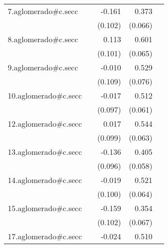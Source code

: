 {\begin{longtable}{l*{4}{D{.}{.}{-1}}}
\addlinespace
7.aglomerado#c.secc&                     &      -0.161         &       0.373\sym{***}&                     \\
            &                     &     (0.102)         &     (0.066)         &                     \\
\addlinespace
8.aglomerado#c.secc&                     &       0.113         &       0.601\sym{***}&                     \\
            &                     &     (0.101)         &     (0.065)         &                     \\
\addlinespace
9.aglomerado#c.secc&                     &      -0.010         &       0.529\sym{***}&                     \\
            &                     &     (0.109)         &     (0.076)         &                     \\
\addlinespace
10.aglomerado#c.secc&                     &      -0.017         &       0.512\sym{***}&                     \\
            &                     &     (0.097)         &     (0.061)         &                     \\
\addlinespace
12.aglomerado#c.secc&                     &       0.017         &       0.544\sym{***}&                     \\
            &                     &     (0.099)         &     (0.063)         &                     \\
\addlinespace
13.aglomerado#c.secc&                     &      -0.136         &       0.405\sym{***}&                     \\
            &                     &     (0.096)         &     (0.058)         &                     \\
\addlinespace
14.aglomerado#c.secc&                     &      -0.019         &       0.521\sym{***}&                     \\
            &                     &     (0.100)         &     (0.064)         &                     \\
\addlinespace
15.aglomerado#c.secc&                     &      -0.159         &       0.354\sym{***}&                     \\
            &                     &     (0.102)         &     (0.067)         &                     \\
\addlinespace
17.aglomerado#c.secc&                     &      -0.024         &       0.510\sym{***}&                     \\

\end{longtable}}
